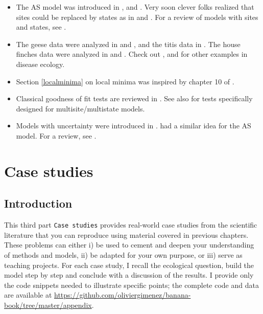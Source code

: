\documentclass[
  12pt,
]{krantz}
\begin{document}
\begin{itemize}
\item
  The AS model was introduced in \citet{arnason1972}, \citet{arnason1973} and \citet{SchwarzEtAl1993}. Very soon clever folks realized that sites could be replaced by states as in \citet{NicholsEtAl1992} and \citet{NicholsEtAl1994}. For a review of models with sites and states, see \citet{LebretonEtAl2009}.
\item
  The geese data were analyzed in \citet{hestbeck1991estimates} and \citet{BrownieEtAl1993}, and the titis data in \citet{scofield2001titi}. The house finches data were analyzed in \citet{FaustinoEtAl2004} and \citeauthor{ConnCooch2009} \citetext{\citeyear{ConnCooch2009}; \citealp[see also][]{cooch2012disease}}. Check out \citet{santoro2014host}, \citet{MarescotEtAl2018} and \citet{ollivier2023lyme} for other examples in disease ecology.
\item
  Section \ref{localminima} on local minima was inspired by chapter 10 of \citet{cooch2017intromark}.
\item
  Classical goodness of fit tests are reviewed in \citet{pradel2005gof}. See also \citet{pradel2003gof} for tests specifically designed for multisite/multistate models.
\item
  Models with uncertainty were introduced in \citet{pradel_multievent_2005}. \citet{dupuis_bayesian_1995} had a similar idea for the AS model. For a review, see \citet{gimenez_estimating_2012}.
\end{itemize}

\part{Case studies}\label{part-case-studies}

\chapter*{Introduction}\label{introduction-7}


This third part \texttt{Case\ studies} provides real-world case studies from the scientific literature that you can reproduce using material covered in previous chapters. These problems can either i) be used to cement and deepen your understanding of methods and models, ii) be adapted for your own purpose, or iii) serve as teaching projects. For each case study, I recall the ecological question, build the model step by step and conclude with a discussion of the results. I provide only the code snippets needed to illustrate specific points; the complete code and data are available at \url{https://github.com/oliviergimenez/banana-book/tree/master/appendix}.
\end{document}
